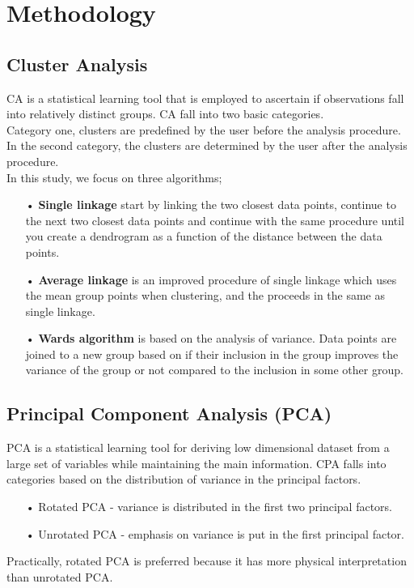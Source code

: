 \documentclass[12pt,a4paper]{article}
\begin{document}
\section{Methodology}
\subsection{Cluster Analysis }
CA is a statistical learning tool that is employed to ascertain if observations fall into relatively distinct groups. CA fall into two basic categories.\\
Category one, clusters are predefined by the user before the analysis procedure. In the second category, the clusters are determined by the user after the analysis procedure. \\
In this study, we focus on three algorithms;
\begin{enumerate}
\item[•]\textbf{Single linkage} start by linking the two closest data points, continue to the next two closest data points and continue with the same procedure until you create a dendrogram as a function of the distance between the data points.
\item[•]\textbf{Average linkage} is an improved procedure of single linkage which uses the mean group points when clustering, and the proceeds in the same as single linkage.
\item[•]\textbf{Wards algorithm} is based on the analysis of variance. Data points are joined to a new group based on if their inclusion in the group improves the variance of the group or not compared to the inclusion in some other group.
\end{enumerate}
\subsection{Principal Component Analysis (PCA) }
PCA is a statistical learning tool for deriving low dimensional dataset from a large set of variables while maintaining the main information. CPA falls into categories based on the distribution of variance in the principal factors.
\begin{enumerate}
\item[•]Rotated PCA - variance is distributed in the first two principal factors. 
\item[•]Unrotated PCA - emphasis on variance is put in the first principal factor. 
\end{enumerate}
Practically, rotated PCA is preferred because it has more physical interpretation than unrotated PCA.
\end{document}
